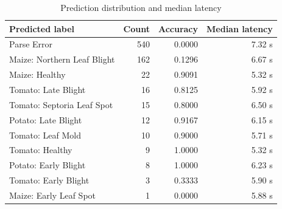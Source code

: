 \documentclass{article}
\begin{document}
\begin{table}[htbp]
  \centering
  \caption{Prediction distribution and median latency}
  \label{tab:prediction_distribution}
  \begin{tabular}{lrrr}
    \toprule
    \textbf{Predicted label} & \textbf{Count} & \textbf{Accuracy} & \textbf{Median latency} \\
    \midrule
    Parse Error & 540 & 0.0000 & 7.32 s \\
    Maize: Northern Leaf Blight & 162 & 0.1296 & 6.67 s \\
    Maize: Healthy & 22 & 0.9091 & 5.32 s \\
    Tomato: Late Blight & 16 & 0.8125 & 5.92 s \\
    Tomato: Septoria Leaf Spot & 15 & 0.8000 & 6.50 s \\
    Potato: Late Blight & 12 & 0.9167 & 6.15 s \\
    Tomato: Leaf Mold & 10 & 0.9000 & 5.71 s \\
    Tomato: Healthy & 9 & 1.0000 & 5.32 s \\
    Potato: Early Blight & 8 & 1.0000 & 6.23 s \\
    Tomato: Early Blight & 3 & 0.3333 & 5.90 s \\
    Maize: Early Leaf Spot & 1 & 0.0000 & 5.88 s \\
    \bottomrule
  \end{tabular}
\end{table}
\end{document}
